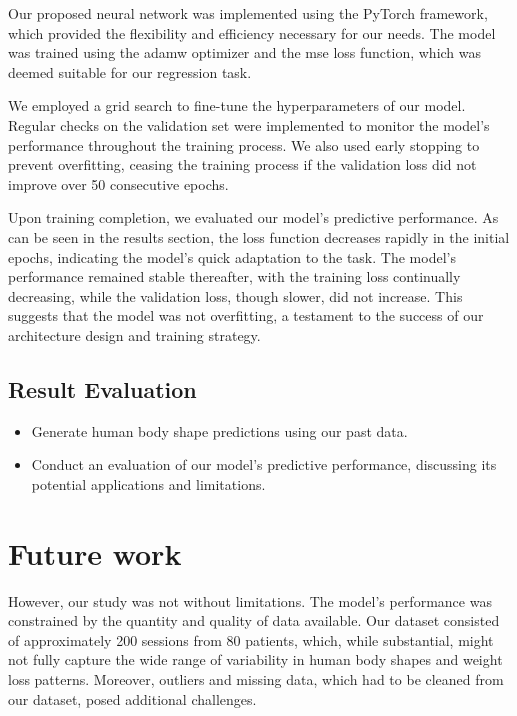 Our proposed neural network was implemented using the PyTorch framework, which
provided the flexibility and efficiency necessary for our needs. The model was
trained using the \gls{adamw} optimizer and the \gls{mse} loss function, which
was deemed suitable for our regression task.

We employed a grid search to fine-tune the hyperparameters of our model.
Regular checks on the validation set were implemented to monitor the model's
performance throughout the training process. We also used early stopping to
prevent overfitting, ceasing the training process if the validation loss did
not improve over 50 consecutive epochs.

Upon training completion, we evaluated our model's predictive performance. As
can be seen in the results section, the loss function decreases rapidly in the
initial epochs, indicating the model's quick adaptation to the task. The
model's performance remained stable thereafter, with the training loss
continually decreasing, while the validation loss, though slower, did not
increase. This suggests that the model was not overfitting, a testament to the
success of our architecture design and training strategy.

\subsection{Result Evaluation}

\begin{itemize}
      \item Generate human body shape predictions using our past data.
      \item Conduct an evaluation of our model's predictive performance, discussing its
            potential applications and limitations.
\end{itemize}

\section{Future work}

However, our study was not without limitations. The model's performance was
constrained by the quantity and quality of data available. Our dataset
consisted of approximately 200 sessions from 80 patients, which, while
substantial, might not fully capture the wide range of variability in human
body shapes and weight loss patterns. Moreover, outliers and missing data,
which had to be cleaned from our dataset, posed additional challenges.

